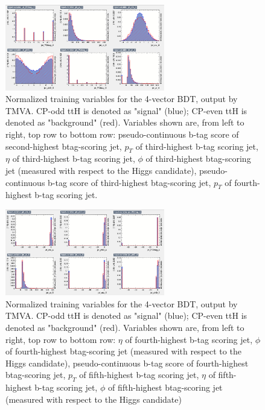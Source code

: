 \begin{figure}[htbp]
  \centering
  \includegraphics[width=0.62\textwidth]{figures/TMVABDTStudies/had-vbls4vec/had4vecvbls4.png}
  \caption{Normalized training variables for the 4-vector BDT, output by TMVA. CP-odd ttH is denoted as "signal" (blue); CP-even ttH is denoted as "background" (red). Variables shown are, from left to right, top row to bottom row: pseudo-continuous b-tag score of second-highest btag-scoring jet, $p_{T}$ of third-highest b-tag scoring jet, $\eta$ of third-highest b-tag scoring jet, $\phi$ of third-highest btag-scoring jet (measured with respect to the Higgs candidate), pseudo-continuous b-tag score of third-highest btag-scoring jet, $p_{T}$ of fourth-highest b-tag scoring jet.}
  \label{fig:had4vecvbls4}
\end{figure}

\begin{figure}[htbp]
  \centering
  \includegraphics[width=0.62\textwidth]{figures/TMVABDTStudies/had-vbls4vec/had4vecvbls5.png}
  \caption{Normalized training variables for the 4-vector BDT, output by TMVA. CP-odd ttH is denoted as "signal" (blue); CP-even ttH is denoted as "background" (red). Variables shown are, from left to right, top row to bottom row: $\eta$ of fourth-highest b-tag scoring jet, $\phi$ of fourth-highest btag-scoring jet (measured with respect to the Higgs candidate), pseudo-continuous b-tag score of fourth-highest btag-scoring jet, $p_{T}$ of fifth-highest b-tag scoring jet, $\eta$ of fifth-highest b-tag scoring jet, $\phi$ of fifth-highest btag-scoring jet (measured with respect to the Higgs candidate)}
  \label{fig:had4vecvbls5}
\end{figure}
  
